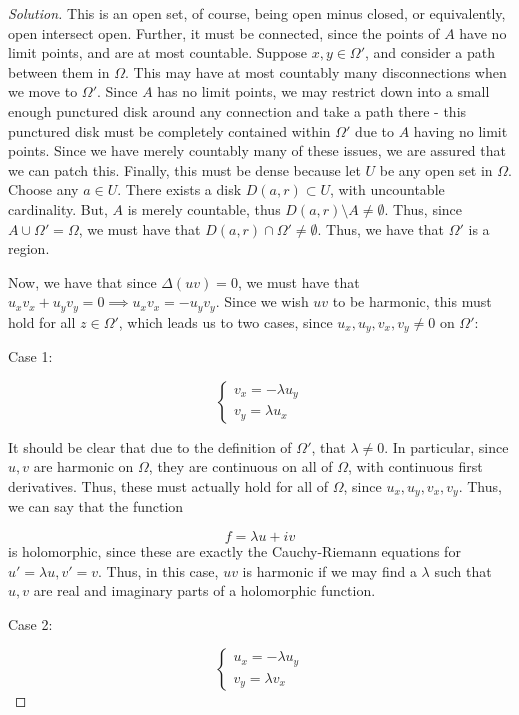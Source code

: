 \documentclass[10pt]{article}
\begin{document}
\begin{proof}[Solution]
This is an open set, of course, being open minus closed, or equivalently, open intersect open. Further, it must be connected, since the points of $A$ have no limit points, and are at most countable. Suppose $x,y \in \Omega'$, and consider a path between them in $\Omega$. This may have at most countably many disconnections when we move to $\Omega'$. Since $A$ has no limit points, we may restrict down into a small enough punctured disk around any connection and take a path there - this punctured disk must be completely contained within $\Omega'$ due to $A$ having no limit points. Since we have merely countably many of these issues, we are assured that we can patch this. Finally, this must be dense because let $U$ be any open set in $\Omega$. Choose any $a \in U$. There exists a disk $D(a,r) \subset U$, with uncountable cardinality. But, $A$ is merely countable, thus $D(a,r) \setminus A \not = \emptyset$. Thus, since $A \cup \Omega' = \Omega$, we must have that $D(a,r) \cap \Omega' \not  = \emptyset$. Thus, we have that $\Omega'$ is a region.

Now, we have that since $\Delta(uv) = 0$, we must have that $u_x v_x + u_y v_y = 0 \implies u_x v_x = -u_y v_y$. Since we wish $uv$ to be harmonic, this must hold for all $z \in \Omega'$, which leads us to two cases, since $u_x, u_y, v_x, v_y \not = 0$ on $\Omega'$:

Case 1:

$$ \begin{cases} v_x = -\lambda u_y \\ v_y = \lambda u_x \end{cases}$$

It should be clear that due to the definition of $\Omega'$, that $\lambda \not = 0 $. In particular, since $u,v$ are harmonic on $\Omega$, they are continuous on all of $\Omega$, with continuous first derivatives. Thus, these must actually hold for all of $\Omega$, since $u_x,u_y, v_x, v_y$. Thus, we can say that the function

$$ f = \lambda u + iv $$ is holomorphic, since these are exactly the Cauchy-Riemann equations for $u' = \lambda u, v' = v$. Thus, in this case, $uv$ is harmonic if we may find a $\lambda$ such that $u,v$ are real and imaginary parts of a holomorphic function.

Case 2:

$$ \begin{cases} u_x = -\lambda u_y \\ v_y = \lambda v_x \end{cases}$$


\end{proof}
\end{document}
